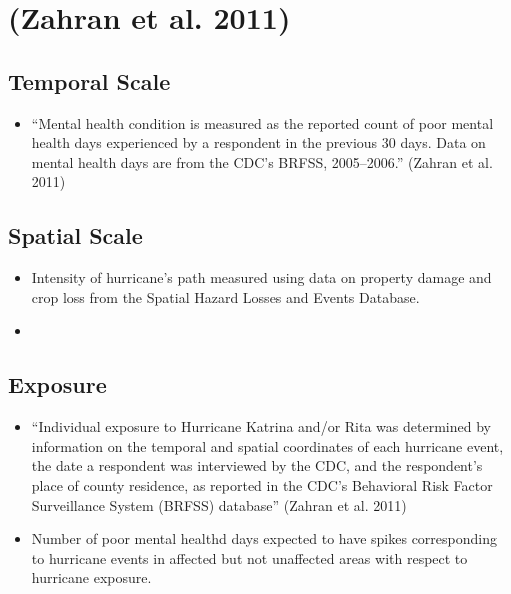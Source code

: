 \documentclass[
]{article}
\providecommand{\tightlist}{%
  \setlength{\itemsep}{0pt}\setlength{\parskip}{0pt}}
\begin{document}
\hypertarget{zahran2011economics}{%
\section{(Zahran et al. 2011)}\label{zahran2011economics}}

\hypertarget{temporal-scale-9}{%
\subsection{Temporal Scale}\label{temporal-scale-9}}

\begin{itemize}
\tightlist
\item
  ``Mental health condition is measured as the reported count of poor
  mental health days experienced by a respondent in the previous 30
  days. Data on mental health days are from the CDC's BRFSS,
  2005--2006.'' (Zahran et al. 2011)
\end{itemize}

\hypertarget{spatial-scale-12}{%
\subsection{Spatial Scale}\label{spatial-scale-12}}

\begin{itemize}
\item
  Intensity of hurricane's path measured using data on property damage
  and crop loss from the Spatial Hazard Losses and Events Database.
\item
\end{itemize}

\hypertarget{exposure-6}{%
\subsection{Exposure}\label{exposure-6}}

\begin{itemize}
\tightlist
\item
  ``Individual exposure to Hurricane Katrina and/or Rita was determined
  by information on the temporal and spatial coordinates of each
  hurricane event, the date a respondent was interviewed by the CDC, and
  the respondent's place of county residence, as reported in the CDC's
  Behavioral Risk Factor Surveillance System (BRFSS) database'' (Zahran
  et al. 2011)
\item
  Number of poor mental healthd days expected to have spikes
  corresponding to hurricane events in affected but not unaffected areas
  with respect to hurricane exposure.
\end{itemize}
\end{document}
